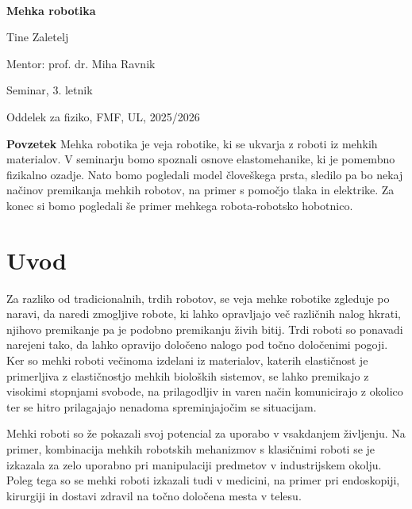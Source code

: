 \documentclass[12pt ]{article}
\begin{document}
 $~$ 
\vspace{2cm}
\centerline{\bf \huge   Mehka robotika} 
\vspace{1cm} 
\centerline{\huge  Tine Zaletelj}
\vspace{1cm}
\centerline{\large Mentor: prof. dr. Miha Ravnik}
\vspace{1cm}
\centerline{\large Seminar, 3. letnik}
\vspace{1cm}
\centerline{\large Oddelek za fiziko, FMF, UL, 2025/2026}
\vspace{6cm}
  
  \begin{minipage}[c]{0.9\hsize}
  {\bf Povzetek}
  Mehka robotika je veja robotike, ki se ukvarja z roboti iz mehkih materialov. V seminarju bomo spoznali osnove elastomehanike, ki je pomembno fizikalno ozadje. Nato bomo pogledali model človeškega prsta, sledilo pa bo nekaj načinov premikanja mehkih robotov, na primer s pomočjo tlaka in elektrike. Za konec si bomo pogledali še primer mehkega robota-robotsko hobotnico.   
    \end{minipage}

 
 \newpage
  
  
\section{Uvod}
Za razliko od tradicionalnih, trdih robotov, se veja mehke robotike zgleduje po naravi, da naredi zmogljive robote, ki lahko opravljajo več različnih nalog hkrati, njihovo premikanje pa je podobno premikanju živih bitij. Trdi roboti so ponavadi narejeni tako, da lahko opravijo določeno nalogo pod točno določenimi pogoji. Ker so mehki roboti večinoma izdelani iz materialov, katerih elastičnost je primerljiva z elastičnostjo mehkih bioloških sistemov, se lahko premikajo z visokimi stopnjami svobode, na prilagodljiv in varen način komunicirajo z okolico ter se hitro prilagajajo nenadoma spreminjajočim se situacijam\cite{yasa2023overview}.

Mehki roboti so že pokazali svoj potencial za uporabo v vsakdanjem življenju. Na primer, kombinacija mehkih robotskih mehanizmov s klasičnimi roboti se je izkazala za zelo uporabno pri manipulaciji predmetov v industrijskem okolju. Poleg tega so se mehki roboti izkazali tudi v medicini, na primer pri endoskopiji, kirurgiji in dostavi zdravil na točno določena mesta v telesu\cite{yasa2023overview}.
\end{document}
